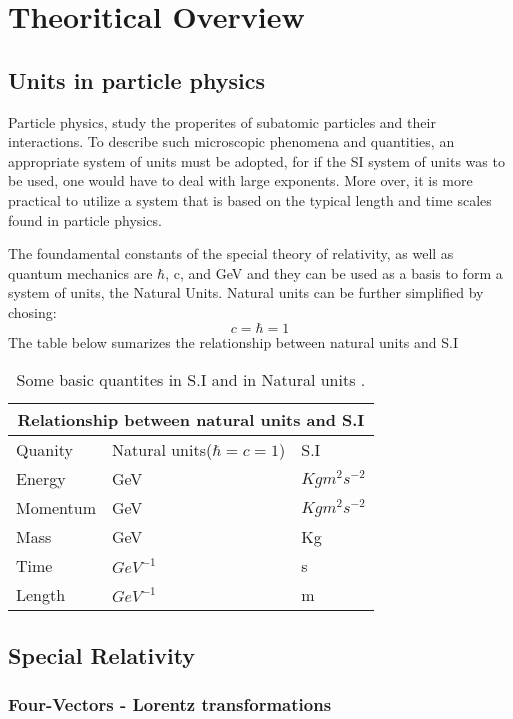 
\chapter{Theoritical Overview}
\label{sec:org2ae82f1}
\section{Units in particle physics}
\label{sec:org2338bc0}
Particle physics, study the properites of subatomic particles and their interactions. To describe such microscopic phenomena and quantities, an appropriate system of units must be adopted, for if the SI system of units was to be used, one would have to deal with large exponents. More over, it is more practical to utilize a system that is based on the typical length and time scales found in particle physics\cite{thomson_2013}.

The foundamental constants of the special theory of relativity, as well as quantum mechanics are \(\hbar\), c, and  GeV and they can be used as a basis to form a system of units, the Natural Units. Natural units can be further simplified by chosing:
\[ c = \hbar = 1\]
The table below sumarizes the relationship between natural units and S.I

\begin{table}[h!]
\centering
\begin{tabular}{ |p{3cm}|p{4cm}|p{3cm}|  }
 \hline
 \multicolumn{3}{|c|}{Relationship between natural units and S.I} \\
 \hline
 \hline
Quanity & Natural units($ \hbar = c = 1 $) & S.I \\
 \hline
Energy & GeV & $Kg m^{2}s^{-2}$ \\
Momentum & GeV& $ Kg m^{2}s^{-2}$ \\
Mass & GeV & Kg\\
Time & $GeV^{-1}$ & s\\
Length & $GeV^{-1}$ & m\\
 \hline
\end{tabular}
\caption{Some basic quantites in S.I and in Natural units .}
\label{table:natural_units}
\end{table}

\section{Special Relativity}
\label{sec:orgd8ae263}

\subsection{Four-Vectors - Lorentz transformations}
\label{sec:orgec107fd}

